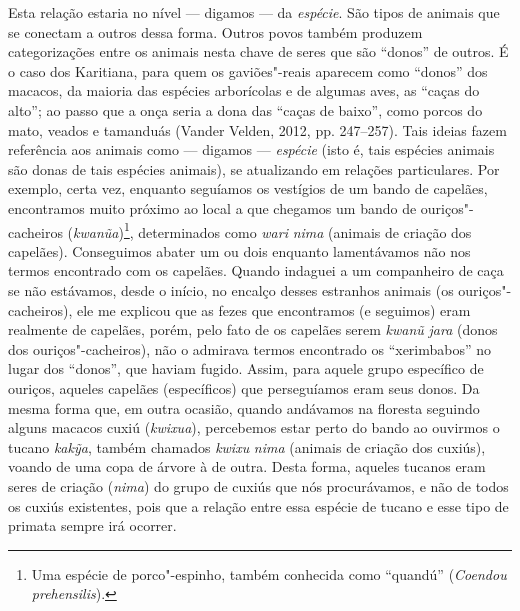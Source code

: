 Esta relação estaria no nível --- digamos --- da \emph{espécie}. São tipos
de animais que se conectam a outros dessa forma. Outros povos também
produzem categorizações entre os animais nesta chave de seres que são
``donos'' de outros. É o caso dos Karitiana, para quem os gaviões"-reais
aparecem como ``donos'' dos macacos, da maioria das espécies arborícolas
e de algumas aves, as ``caças do alto''; ao passo que a onça seria a
dona das ``caças de baixo'', como porcos do mato, veados e tamanduás
(Vander Velden, 2012, pp. 247--257). Tais ideias fazem referência aos
animais como --- digamos --- \emph{espécie} (isto é, tais espécies animais
são donas de tais espécies animais), se atualizando em relações
particulares. Por exemplo, certa vez, enquanto seguíamos os vestígios de
um bando de capelães, encontramos muito próximo ao local a que chegamos
um bando de ouriços"-cacheiros (\emph{kwanũa})\footnote{Uma espécie de
  porco"-espinho, também conhecida como ``quandú'' (\emph{Coendou
  prehensilis}).}, determinados como \emph{wari} \emph{nima} (animais de
criação dos capelães). Conseguimos abater um ou dois enquanto
lamentávamos não nos termos encontrado com os capelães. Quando indaguei
a um companheiro de caça se não estávamos, desde o início, no encalço
desses estranhos animais (os ouriços"-cacheiros), ele me explicou que as
fezes que encontramos (e seguimos) eram realmente de capelães, porém,
pelo fato de os capelães serem \emph{kwanũ} \emph{jara} (donos dos
ouriços"-cacheiros), não o admirava termos encontrado os ``xerimbabos'' no
lugar dos ``donos'', que haviam fugido. Assim, para aquele grupo
específico de ouriços, aqueles capelães (específicos) que perseguíamos
eram seus donos. Da mesma forma que, em outra ocasião, quando andávamos
na floresta seguindo alguns macacos cuxiú (\emph{kwixua}), percebemos
estar perto do bando ao ouvirmos o tucano \emph{kakỹa}, também chamados
\emph{kwixu} \emph{nima} (animais de criação dos cuxiús), voando de uma
copa de árvore à de outra. Desta forma, aqueles tucanos eram seres de
criação (\emph{nima}) do grupo de cuxiús que nós procurávamos, e não de
todos os cuxiús existentes, pois que a relação entre essa espécie de
tucano e esse tipo de primata sempre irá ocorrer.

